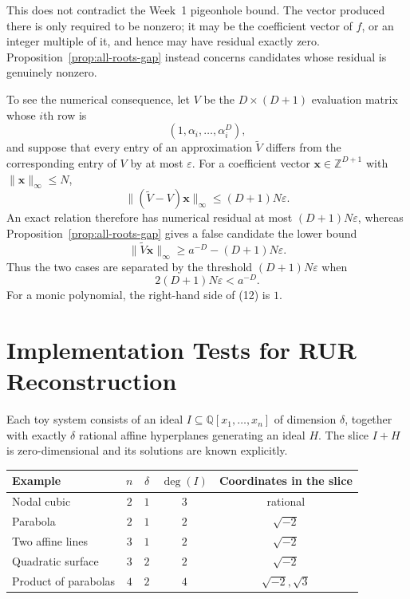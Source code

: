 \documentclass{weeklyprogress}
\begin{document}
This does not contradict the Week~1 pigeonhole bound.  The vector produced
there is only required to be nonzero; it may be the coefficient vector of
$f$, or an integer multiple of it, and hence may have residual exactly zero.
Proposition~\ref{prop:all-roots-gap} instead concerns candidates whose
residual is genuinely nonzero.

To see the numerical consequence, let $V$ be the $D\times(D+1)$ evaluation
matrix whose $i$th row is
\[
 (1,\alpha_i,\ldots,\alpha_i^D),
\]
and suppose that every entry of an approximation $\widetilde V$ differs from
the corresponding entry of $V$ by at most $\varepsilon$.  For a coefficient
vector $\bm{x}\in\mathbb{Z}^{D+1}$ with
$\lVert\bm{x}\rVert_\infty\leq N$,
\[
 \lVert(\widetilde V-V)\bm{x}\rVert_\infty
 \leq(D+1)N\varepsilon.
\]
An exact relation therefore has numerical residual at most
$(D+1)N\varepsilon$, whereas Proposition~\ref{prop:all-roots-gap} gives a
false candidate the lower bound
\[
 \lVert\widetilde V\bm{x}\rVert_\infty
 \geq a^{-D}-(D+1)N\varepsilon.
\]
Thus the two cases are separated by the threshold $(D+1)N\varepsilon$ when
\[
 2(D+1)N\varepsilon<a^{-D}.
 \tag{12}
\]
For a monic polynomial, the right-hand side of (12) is $1$.

\section{Implementation Tests for RUR Reconstruction}

Each toy system consists of an ideal
$I\subseteq\mathbb{Q}[x_1,\ldots,x_n]$ of dimension $\delta$, together with
exactly $\delta$ rational affine hyperplanes generating an ideal $H$.  The
slice $I+H$ is zero-dimensional and its solutions are known explicitly.

\begin{center}
\begin{tabular}{lcccc}
\hline
Example & $n$ & $\delta$ & $\deg(I)$ & Coordinates in the slice \\
\hline
Nodal cubic & $2$ & $1$ & $3$ & rational \\
Parabola & $2$ & $1$ & $2$ & $\sqrt{-2}$ \\
Two affine lines & $3$ & $1$ & $2$ & $\sqrt{-2}$ \\
Quadratic surface & $3$ & $2$ & $2$ & $\sqrt{-2}$ \\
Product of parabolas & $4$ & $2$ & $4$ & $\sqrt{-2},\sqrt{3}$ \\
\hline
\end{tabular}
\end{center}
\end{document}
